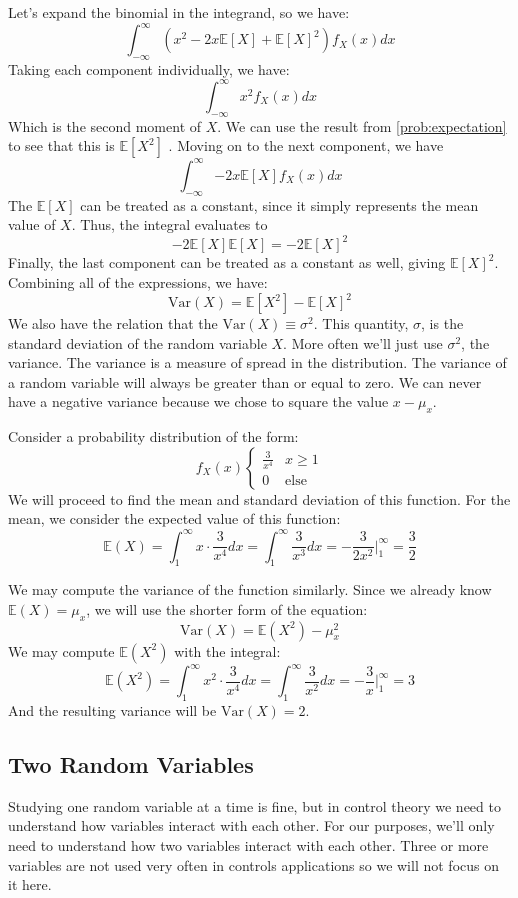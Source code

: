 Let's expand the binomial in the integrand, so we have:
$$\int_{-\infty}^\infty{(x^2-2x\mathbb{E}[X]+\mathbb{E}[X]^2)f_X(x)dx}$$
Taking each component individually, we have:
$$\int_{-\infty}^\infty{x^2f_X(x)dx}$$
Which is the second moment of $X$. We can use the result from \autoref{prob:expectation} to see that this is $\mathbb{E}[X^2]$ . Moving on to the next component, we have 
$$\int_{-\infty}^\infty{-2x\mathbb{E}[X]f_X(x)dx}$$
The $\mathbb{E}[X]$ can be treated as a constant, since it simply represents the mean value of $X$. Thus, the integral evaluates to
$$-2\mathbb{E}[X]\mathbb{E}[X]=-2\mathbb{E}[X]^2$$
Finally, the last component can be treated as a constant as well, giving $\mathbb{E}[X]^2$. Combining all of the expressions, we have:
$$\text{Var}(X)=\mathbb{E}[X^2]-\mathbb{E}[X]^2$$
We also have the relation that the $\text{Var}(X)\equiv \sigma^2$. This quantity, $\sigma$, is the standard deviation of the random variable $X$. More often we'll just use $\sigma^2$, the variance. The variance is a measure of spread in the distribution. The variance of a random variable will always be greater than or equal to zero. We can never have a negative variance because we chose to square the value $x-\mu_x$.

\begin{example}
Consider a probability distribution of the form:
$$f_X(x)\begin{cases}
\frac{3}{x^4}&x\ge1\\
0&\text{else}
\end{cases}$$
We will proceed to find the mean and standard deviation of this function. For the mean, we consider the expected value of this function:
$$\mathbb{E}(X)=\int_1^\infty x\cdot\frac{3}{x^4}dx=\int_1^\infty\frac{3}{x^3}dx=-\frac{3}{2x^2}\Bigg\vert^{\infty}_1=\frac{3}{2}$$

We may compute the variance of the function similarly. Since we already know $\mathbb{E}(X)=\mu_x$, we will use the shorter form of the equation:
$$\text{Var}(X)=\mathbb{E}(X^2)-\mu_x^2$$
We may compute $\mathbb{E}(X^2)$ with the integral:
$$\mathbb{E}(X^2)=\int_1^\infty x^2\cdot\frac{3}{x^4}dx=\int_1^\infty\frac{3}{x^2}dx=-\frac{3}{x}\Bigg\vert^{\infty}_1=3$$
And the resulting variance will be $\text{Var}(X)=2$.
\end{example}

\subsection{Two Random Variables}
Studying one random variable at a time is fine, but in control theory we need to understand how variables interact with each other. For our purposes, we'll only need to understand how two variables interact with each other. Three or more variables are not used very often in controls applications so we will not focus on it here.

